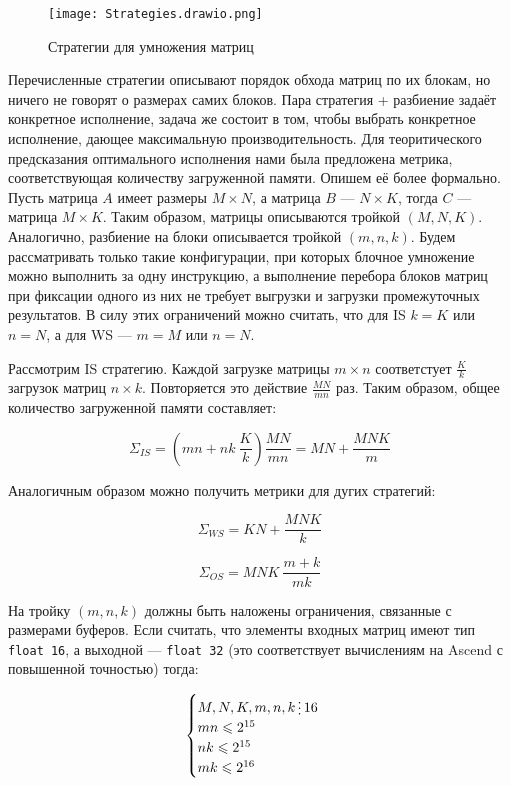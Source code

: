 \begin{figure}[h!]
    \centering
    \texttt{[image: Strategies.drawio.png]}
    \caption{Стратегии для умножения матриц}
\end{figure}

Перечисленные стратегии описывают порядок обхода матриц по их блокам, но ничего
не говорят о размерах самих блоков. Пара стратегия + разбиение задаёт конкретное
исполнение, задача же состоит в том, чтобы выбрать конкретное исполнение, дающее
максимальную производительность. Для теоритического предсказания оптимального
исполнения нами была предложена метрика, соответствующая количеству загруженной
памяти. Опишем её более формально. Пусть матрица $A$ имеет размеры $M \times N$, а
матрица $B$ --- $N \times K$, тогда $C$ --- матрица $M \times K$. Таким образом,
матрицы описываются тройкой $(M, N, K)$. Аналогично, разбиение на блоки
описывается тройкой $(m, n, k)$. Будем рассматривать только такие конфигурации,
при которых блочное умножение можно выполнить за одну инструкцию, а выполнение
перебора блоков матриц при фиксации одного из них не требует выгрузки и загрузки
промежуточных результатов. В силу этих ограничений можно считать, что для IS
$k = K$ или $n = N$, а для WS --- $m = M$ или $n = N$.

Рассмотрим IS стратегию. Каждой загрузке матрицы $m \times n$ соответстует
$\frac{K}{k}$ загрузок матриц $n \times k$. Повторяется это действие
$\frac{MN}{mn}$ раз. Таким образом, общее количество загруженной памяти
составляет:

\[
    \Sigma_{IS} = \left( mn + nk ~ \frac{K}{k} \right) \frac{MN}{mn} = MN + \frac{MNK}{m}
\]

Аналогичным образом можно получить метрики для дугих стратегий:

\[
    \Sigma_{WS} = KN + \frac{MNK}{k}
\]

\[
    \Sigma_{OS} = MNK ~ \frac{m + k}{mk}
\]

На тройку $(m, n, k)$ должны быть наложены ограничения, связанные с размерами буферов.
Если считать, что элементы входных матриц имеют тип \texttt{float 16}, а выходной ---
\texttt{float 32} (это соответствует вычислениям на Ascend с повышенной точностью) тогда:

\[
\begin{cases}
    M, N, K, m, n, k \divisible 16 \\
    mn \leqslant 2^{15} \\
    nk \leqslant 2^{15} \\
    mk \leqslant 2^{16}
\end{cases}
\]


